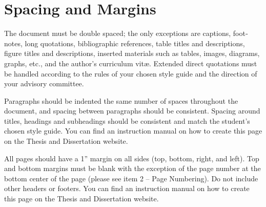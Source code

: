 \section{Spacing and Margins}

 The document must be double spaced; the only exceptions are captions, foot‐ notes, long  quotations, bibliographic references, table titles and descriptions, figure titles and descriptions,  inserted materials such as tables, images, diagrams, graphs, etc., and the author's curriculum  vit\ae. Extended direct quotations must be handled according to the rules of your chosen style guide and the direction of your advisory committee. 
 
 Paragraphs should be indented the same number of spaces throughout the document, and
 spacing between paragraphs should be consistent. Spacing around titles, headings and subheadings should be consistent and match the student's chosen style guide. You can find an instruction manual on how to create this page on the Thesis and Dissertation website. 

 All pages should have a 1” margin on all sides (top, bottom, right, and left). Top and bottom margins must be blank with the exception of the page number at the bottom center of the page (please see item 2 – Page Numbering). Do not include other headers or footers. You can find an instruction manual on how to create this page on the Thesis and Dissertation website. 

